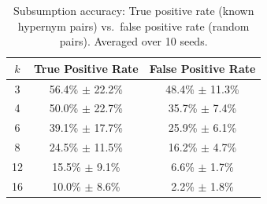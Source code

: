 \begin{table}[h]
\centering
\caption{Subsumption accuracy: True positive rate (known hypernym pairs) vs.\ false positive rate (random pairs). Averaged over 10 seeds.}
\label{tab:subsumption}
\begin{tabular}{ccc}
\toprule
$k$ & True Positive Rate & False Positive Rate \\
\midrule
3 & 56.4\% $\pm$ 22.2\% & 48.4\% $\pm$ 11.3\% \\
4 & 50.0\% $\pm$ 22.7\% & 35.7\% $\pm$ 7.4\% \\
6 & 39.1\% $\pm$ 17.7\% & 25.9\% $\pm$ 6.1\% \\
8 & 24.5\% $\pm$ 11.5\% & 16.2\% $\pm$ 4.7\% \\
12 & 15.5\% $\pm$ 9.1\% & 6.6\% $\pm$ 1.7\% \\
16 & 10.0\% $\pm$ 8.6\% & 2.2\% $\pm$ 1.8\% \\
\bottomrule
\end{tabular}
\end{table}
